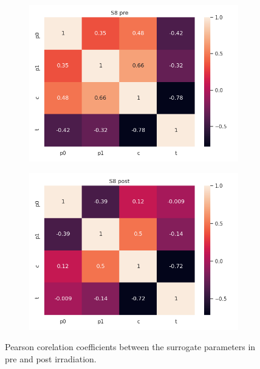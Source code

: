 \begin{figure}[H]
    \centering
\begin{subfigure}[b]{0.45\textwidth}
    \centering
    \includegraphics[width=\linewidth]{figures/chapter4/surrogates/p1_S8_corr_pre.png}
  \end{subfigure}
\begin{subfigure}[b]{0.45\textwidth}
    \centering
    \includegraphics[width=\linewidth]{figures/chapter4/surrogates/p1_S8_corr_post.png}
  \end{subfigure}
    \label{plot:corr_matrix}
  \caption[Corelation surogate params]{Pearson corelation coefficients between the surrogate parameters in pre and post irradiation.}
\end{figure}


